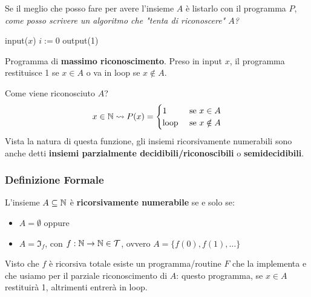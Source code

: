 Se il meglio che posso fare per avere l'insieme $A$ è listarlo con il programma $P$, \textit{come posso scrivere un algoritmo che "tenta di riconoscere" $A$?}

\vspace{0.5em}
\hspace{4em}
\begin{minipage}{.3\textwidth}
	\begin{tcolorbox}[
		colback=white,
		sharp corners,
		boxrule=.3mm,
		boxsep=0pt,
		left=20pt
		]
		\begin{algorithm}[H]
			\SetAlgoNoEnd
			input($x$)\;
			$i:=0$\;
			output(1)\;
		\end{algorithm}
	\end{tcolorbox}
\end{minipage}
\hspace{2em}
\begin{minipage}{.55\textwidth}
	Programma di \textbf{massimo riconoscimento}. Preso in input $x$, il programma restituisce 1 se $x\in A$ o va in loop se $x\notin A$.
\end{minipage}\vspace{0.5em}

Come viene riconosciuto $A$?
$$ x \in \mathbb{N} \rightsquigarrow P(x) = \begin{cases}
	1 & \text{ se } x \in A \\
	\text{loop} & \text{ se } x \notin A
\end{cases}$$
Vista la natura di questa funzione, gli insiemi ricorsivamente numerabili sono anche detti \textbf{insiemi parzialmente decidibili/riconoscibili} o \textbf{semidecidibili}.

\subsubsection{Definizione Formale}
L'insieme $A \subseteq \mathbb{N}$ è \textbf{ricorsivamente numerabile} se e solo se:
\begin{itemize}
	\item $A = \emptyset$ oppure
    
	\item $A = \Im_f$, con $f: \mathbb{N} \rightarrow \mathbb{N} \in \mathcal{T}$, ovvero $A = \{f(0), f(1), \dots\}$
\end{itemize}

Visto che $f$ è ricorsiva totale esiste un programma/routine $F$ che la implementa e che usiamo per il parziale riconoscimento di $A$: questo programma, se $x \in A$ restituirà 1, altrimenti entrerà in loop.

